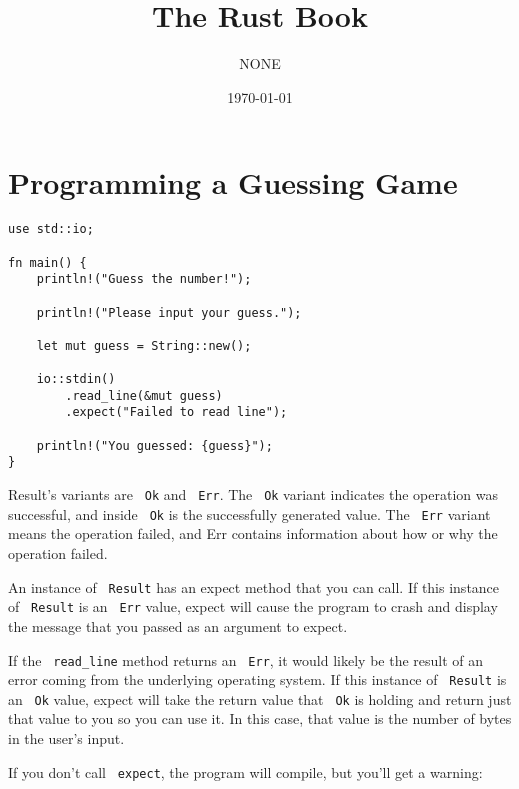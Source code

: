\documentclass[11pt]{article}
\author{NONE}
\date{\today}
\title{The Rust Book}
\let\OldTexttt\texttt
\renewcommand{\texttt}[1]{\OldTexttt{\color{MidnightBlue} #1}}
\begin{document}
\maketitle
\tableofcontents


\section{Programming a Guessing Game}
\label{sec:org6bbc430}
\begin{verbatim}
use std::io;

fn main() {
    println!("Guess the number!");

    println!("Please input your guess.");

    let mut guess = String::new();

    io::stdin()
        .read_line(&mut guess)
        .expect("Failed to read line");

    println!("You guessed: {guess}");
}
\end{verbatim}

Result's variants are \texttt{Ok} and \texttt{Err}. The \texttt{Ok} variant indicates the operation was successful, and
inside \texttt{Ok} is the successfully generated value. The \texttt{Err} variant means the operation failed, and
Err contains information about how or why the operation failed.

An instance of \texttt{Result} has an expect method that you can call. If this instance of \texttt{Result} is an
\texttt{Err} value, expect will cause the program to crash and display the message that you passed as an
argument to expect.

If the \texttt{read\_line} method returns an \texttt{Err}, it would likely be the result of an error coming from
the underlying operating system. If this instance of \texttt{Result} is an \texttt{Ok} value, expect will take the
return value that \texttt{Ok} is holding and return just that value to you so you can use it. In this
case, that value is the number of bytes in the user’s input.

If you don’t call \texttt{expect}, the program will compile, but you’ll get a warning:
\end{document}
